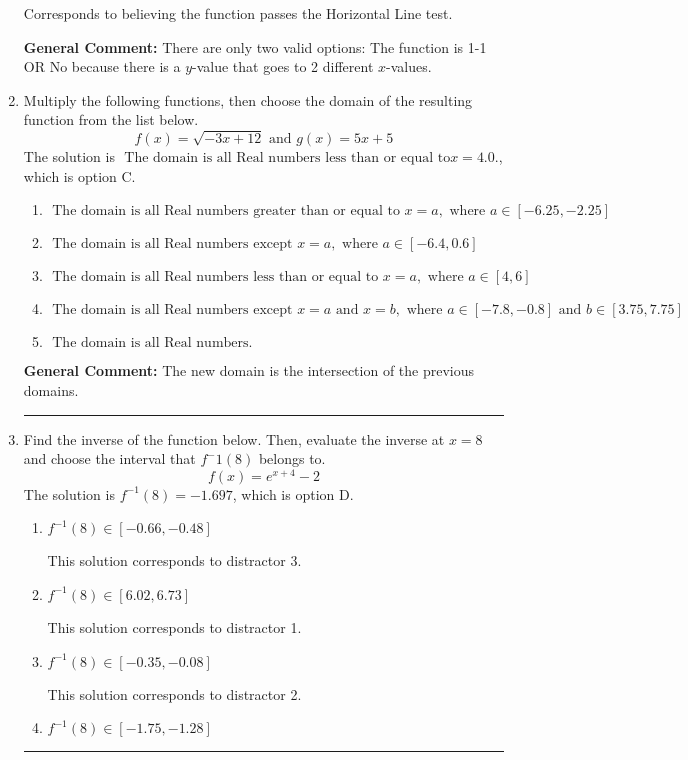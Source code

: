 \documentclass{extbook}[14pt]
\newcommand{\litem}[1]{\item #1

\rule{\textwidth}{0.4pt}}
\begin{document}
\begin{enumerate}
{\begin{enumerate}[label=\Alph*.]
Corresponds to believing the function passes the Horizontal Line test.
\end{enumerate}

\textbf{General Comment:} There are only two valid options: The function is 1-1 OR No because there is a $y$-value that goes to 2 different $x$-values.
}
\litem{
Multiply the following functions, then choose the domain of the resulting function from the list below.
\[ f(x) = \sqrt{-3x+12}  \text{ and } g(x) = 5x + 5 \]The solution is \( \text{ The domain is all Real numbers less than or equal to} x = 4.0. \), which is option C.\begin{enumerate}[label=\Alph*.]
\item \( \text{ The domain is all Real numbers greater than or equal to } x = a, \text{ where } a \in [-6.25, -2.25] \)


\item \( \text{ The domain is all Real numbers except } x = a, \text{ where } a \in [-6.4, 0.6] \)


\item \( \text{ The domain is all Real numbers less than or equal to } x = a, \text{ where } a \in [4, 6] \)


\item \( \text{ The domain is all Real numbers except } x = a \text{ and } x = b, \text{ where } a \in [-7.8, -0.8] \text{ and } b \in [3.75, 7.75] \)


\item \( \text{ The domain is all Real numbers. } \)


\end{enumerate}

\textbf{General Comment:} The new domain is the intersection of the previous domains.
}
\litem{
Find the inverse of the function below. Then, evaluate the inverse at $x = 8$ and choose the interval that $f^-1(8)$ belongs to.
\[ f(x) = e^{x+4}-2 \]The solution is \( f^{-1}(8) = -1.697 \), which is option D.\begin{enumerate}[label=\Alph*.]
\item \( f^{-1}(8) \in [-0.66, -0.48] \)

 This solution corresponds to distractor 3.
\item \( f^{-1}(8) \in [6.02, 6.73] \)

 This solution corresponds to distractor 1.
\item \( f^{-1}(8) \in [-0.35, -0.08] \)

 This solution corresponds to distractor 2.
\item \( f^{-1}(8) \in [-1.75, -1.28] \)


\end{enumerate}}
\end{enumerate}
\end{document}
